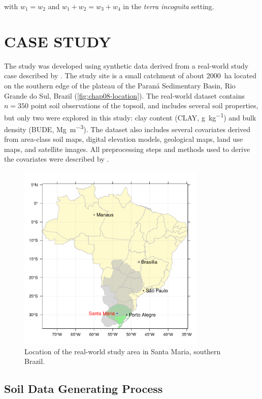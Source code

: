 with $w_1 = w_2$ and $w_1 + w_2 = w_3 + w_4$ in the \emph{terra incognita} setting.

\section{CASE STUDY}

The study was developed using synthetic data derived from a real-world study case described by 
\citet{Samuel-RosaEtAl2015}. The study site is a small catchment of about \SI{2000}{\hectare} located on the 
southern edge of the plateau of the Paraná Sedimentary Basin, Rio Grande do Sul, Brazil 
(\autoref{fig:chap08-location}). The real-world dataset contains $n = 350$ point soil observations of the 
topsoil, and includes several soil properties, but only two were explored in this study: clay content (CLAY, 
\si{\gram\per\kilo\gram}) and bulk density (BUDE, \si{\mega\gram\per\cubic\metre}). The dataset also includes 
several covariates derived from area-class soil maps, digital elevation models, geological maps, land use 
maps, 
and satellite images. All preprocessing steps and methods used to derive the covariates were described by 
\citet{Samuel-RosaEtAl2015}.

\begin{figure}[!ht]
 \centering
 \includegraphics[draft = true, width = 90mm]{fig/chap02-location}
 \caption{Location of the real-world study area in Santa Maria, southern Brazil.}
 \label{fig:chap08-location}
\end{figure}

\subsection{Soil Data Generating Process}


